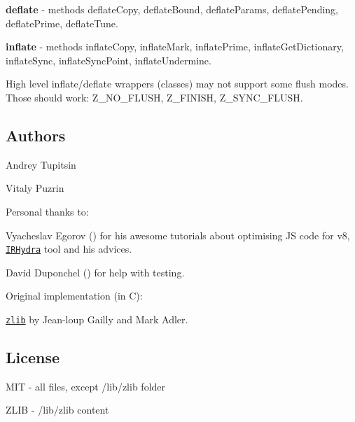 \begin{DoxyItemize}
\item {\bfseries deflate} -\/ methods {\ttfamily deflate\+Copy}, {\ttfamily deflate\+Bound}, {\ttfamily deflate\+Params}, {\ttfamily deflate\+Pending}, {\ttfamily deflate\+Prime}, {\ttfamily deflate\+Tune}.
\item {\bfseries inflate} -\/ methods {\ttfamily inflate\+Copy}, {\ttfamily inflate\+Mark}, {\ttfamily inflate\+Prime}, {\ttfamily inflate\+Get\+Dictionary}, {\ttfamily inflate\+Sync}, {\ttfamily inflate\+Sync\+Point}, {\ttfamily inflate\+Undermine}.
\item High level inflate/deflate wrappers (classes) may not support some flush modes. Those should work\+: Z\+\_\+\+N\+O\+\_\+\+F\+L\+U\+SH, Z\+\_\+\+F\+I\+N\+I\+SH, Z\+\_\+\+S\+Y\+N\+C\+\_\+\+F\+L\+U\+SH.
\end{DoxyItemize}

\subsection*{Authors }


\begin{DoxyItemize}
\item Andrey Tupitsin \href{https://github.com/andr83}{\tt }
\item Vitaly Puzrin \href{https://github.com/puzrin}{\tt }
\end{DoxyItemize}

Personal thanks to\+:


\begin{DoxyItemize}
\item Vyacheslav Egorov (\href{https://github.com/mraleph}{\tt }) for his awesome tutorials about optimising JS code for v8, \href{http://mrale.ph/irhydra/}{\tt I\+R\+Hydra} tool and his advices.
\item David Duponchel (\href{https://github.com/dduponchel}{\tt }) for help with testing.
\end{DoxyItemize}

Original implementation (in C)\+:


\begin{DoxyItemize}
\item \href{http://zlib.net/}{\tt zlib} by Jean-\/loup Gailly and Mark Adler.
\end{DoxyItemize}

\subsection*{License }


\begin{DoxyItemize}
\item M\+IT -\/ all files, except {\ttfamily /lib/zlib} folder
\item Z\+L\+IB -\/ {\ttfamily /lib/zlib} content 
\end{DoxyItemize}